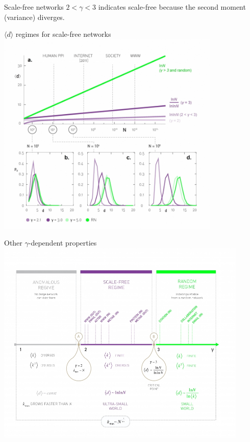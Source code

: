 \documentclass[notes]{beamer}
\begin{document}
\begin{frame}{Scale-free networks}
  $2 < \gamma < 3$ indicates scale-free because the second moment (variance)
  diverges.


\end{frame}

\begin{frame}{$\langle d \rangle$ regimes for scale-free networks}
  \vspace{-1em}
  \centering
  \includegraphics[width=0.8\textwidth]{Figures/scaleFreeDistances.jpg}
\end{frame}

\begin{frame}{Other $\gamma$-dependent properties}
  \vspace{-1em}
  \centering
  \includegraphics[width=0.9\textwidth]{Figures/gammaDependentPropBox.jpg}
\end{frame}
\end{document}

